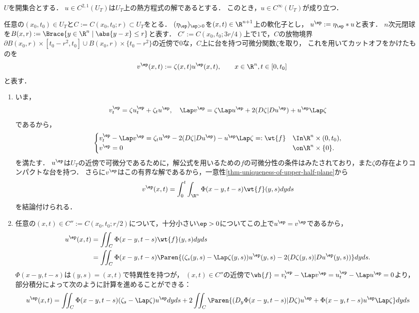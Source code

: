 \documentclass[uplatex,dvipdfmx]{jsreport}
\begin{document}
\begin{theorem}[熱方程式の解の可微分性]\label{thm-smoothness-of-solution-to-HE}
    $U$を開集合とする．
    $u\in C^{2,1}(U_T)$は$U_T$上の熱方程式の解であるとする．
    このとき，$u\in C^\infty(U_T)$が成り立つ．
\end{theorem}
\begin{Proof}
    任意の$(x_0,t_0)\in U_T$と$C:=C(x_0,t_0;r)\subset U_T$をとる．
    $(\eta_\ep)_{\ep>0}$を$(x,t)\in\R^{n+1}$上の軟化子とし，
    $u^\ep:=\eta_\ep*u$と表す．
    $n$次元閉球を$B(x,r):=\Brace{y\in\R^n\mid\abs{y-x}\le r}$と表す．
    $C':=C(x_0,t_0;3r/4)$上で$1$で，$C$の放物境界$\partial B(x_0,r)\times[t_0-r^2,t_0]\cup B(x_0,r)\times\{t_0-r^2\}$の近傍で$0$な，$C$上に台を持つ可微分関数$\zeta$を取り，
    これを用いてカットオフをかけたものを
    \[v^\ep(x,t):=\zeta(x,t)u^\ep(x,t),\qquad x\in\R^n,t\in[0,t_0]\]
    と表す．
    \begin{enumerate}[{Step}1]
        \item いま，
        \[v_t^\ep=\zeta u^\ep_t+\zeta_tu^\ep,\quad\Lap v^\ep=\zeta\Lap u^\ep+2(D\zeta|Du^\ep)+u^\ep\Lap\zeta\]
        であるから，
        \[\begin{cases}
            v^\ep_t-\Lap v^\ep=\zeta_tu^\ep-2(D\zeta|Du^\ep)-u^\ep\Lap\zeta=:\wt{f}&\In\R^n\times(0,t_0),\\
            v^\ep=0&\on\R^n\times\{0\}.
        \end{cases}\]
        を満たす．
        $u^\ep$は$U_T$の近傍で可微分であるために，解公式を用いるための$f$の可微分性の条件はみたされており，また$\zeta$の存在よりコンパクトな台を持つ．
        さらに$v^\ep$はこの有界な解であるから，一意性\ref{thm-uniqueness-of-upper-half-plane}から
        \[v^\ep(x,t)=\int^t_0\int_{\R^n}\Phi(x-y,t-s)\wt{f}(y,s)dyds\]
        を結論付けられる．
        \item 任意の$(x,t)\in C'':=C(x_0,t_0;r/2)$について，十分小さい$\ep>0$についてこの上で$u^\ep=v^\ep$であるから，
        \begin{align*}
            u^\ep(x,t)&=\iint_C\Phi(x-y,t-s)\wt{f}(y,s)dyds\\
            &=\iint_C\Phi(x-y,t-s)\Paren{(\zeta_s(y,s)-\Lap\zeta(y,s))u^\ep(y,s)-2(D\zeta(y,s)|Du^\ep(y,s))}dyds.
        \end{align*}
        $\Phi(x-y,t-s)$は$(y,s)=(x,t)$で特異性を持つが，
        $(x,t)\in C''$の近傍で$\wh{f}=v_t^\ep-\Lap v^\ep=u_t^\ep-\Lap u^\ep=0$より，部分積分によって次のように計算を進めることができる：
        \begin{align*}
            u^\ep(x,t)&=\iint_C\Phi(x-y,t-s)(\zeta_s-\Lap\zeta)u^\ep dyds+2\iint_C\Paren{(D_y\Phi(x-y,t-s)|D\zeta)u^\ep+\Phi(x-y,t-s) u^\ep\Lap\zeta} dyds\\

\end{align*}
\end{enumerate}
\end{Proof}
\end{document}

